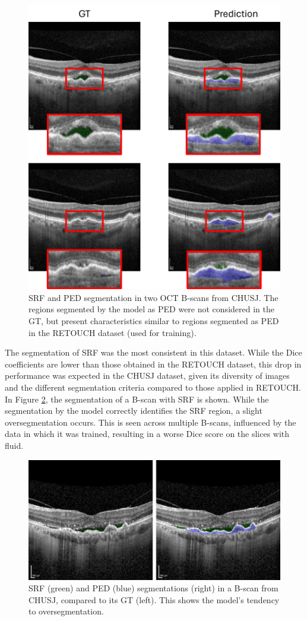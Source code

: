 \begin{figure}[!ht]
	\centering
	\includegraphics[width=0.65\linewidth]{figures/CHUSJPEDSegmentation.png}
	\caption{SRF and PED segmentation in two OCT B-scans from CHUSJ. The regions segmented by the model as PED were not considered in the GT, but present characteristics similar to regions segmented as PED in the RETOUCH dataset (used for training).}
	\label{fig:CHUSJPEDSegmentation}
\end{figure}

The segmentation of SRF was the most consistent in this dataset. While the Dice coefficients are lower than those obtained in the RETOUCH dataset, this drop in performance was expected in the CHUSJ dataset, given its diversity of images and the different segmentation criteria compared to those applied in RETOUCH. In Figure \ref{fig:CHUSJSRFSegmentation}, the segmentation of a B-scan with SRF is shown. While the segmentation by the model correctly identifies the SRF region, a slight oversegmentation occurs. This is seen across multiple B-scans, influenced by the data in which it was trained, resulting in a worse Dice score on the slices with fluid.

\begin{figure}[b]
	\centering
	\includegraphics[width=0.60\linewidth]{figures/CHUSJSRFSegmentation.png}
	\caption{SRF (green) and PED (blue) segmentations (right) in a B-scan from CHUSJ, compared to its GT (left). This shows the model's tendency to oversegmentation.}
	\label{fig:CHUSJSRFSegmentation}
\end{figure}

